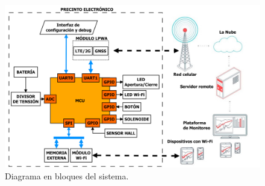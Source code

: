 \documentclass[
11pt, %
]{charter}
\begin{document}
\begin{figure}[htpb]
\centering 
\includegraphics[width=1\textwidth]{./Figuras/diagrama_proyecto.pdf}
\caption{Diagrama en bloques del sistema.}
\label{fig:diagBloques}
\end{figure} 
\end{document}

